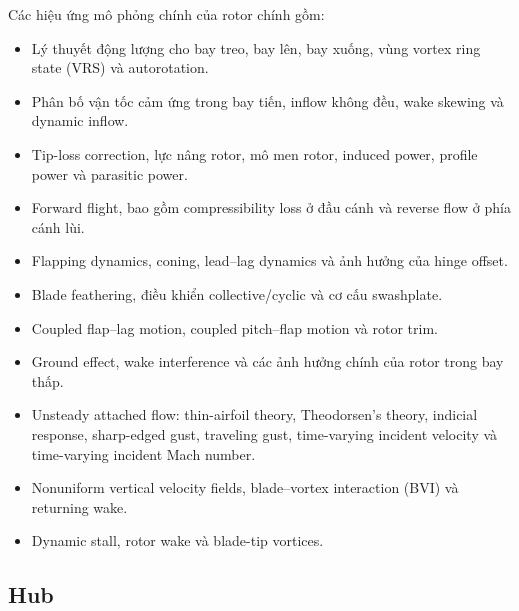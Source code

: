 \documentclass[12pt,a4paper]{article}
\begin{document}
Các hiệu ứng mô phỏng chính của rotor chính gồm:
\begin{itemize}
  \item Lý thuyết động lượng cho bay treo, bay lên, bay xuống, vùng vortex ring state (VRS) và autorotation.
  \item Phân bố vận tốc cảm ứng trong bay tiến, inflow không đều, wake skewing và dynamic inflow.
  \item Tip-loss correction, lực nâng rotor, mô men rotor, induced power, profile power và parasitic power.
  \item Forward flight, bao gồm compressibility loss ở đầu cánh và reverse flow ở phía cánh lùi.
  \item Flapping dynamics, coning, lead--lag dynamics và ảnh hưởng của hinge offset.
  \item Blade feathering, điều khiển collective/cyclic và cơ cấu swashplate.
  \item Coupled flap--lag motion, coupled pitch--flap motion và rotor trim.
  \item Ground effect, wake interference và các ảnh hưởng chính của rotor trong bay thấp.
  \item Unsteady attached flow: thin-airfoil theory, Theodorsen's theory, indicial response, sharp-edged gust, traveling gust, time-varying incident velocity và time-varying incident Mach number.
  \item Nonuniform vertical velocity fields, blade--vortex interaction (BVI) và returning wake.
  \item Dynamic stall, rotor wake và blade-tip vortices.
\end{itemize}


\subsection{Hub}
\end{document}

